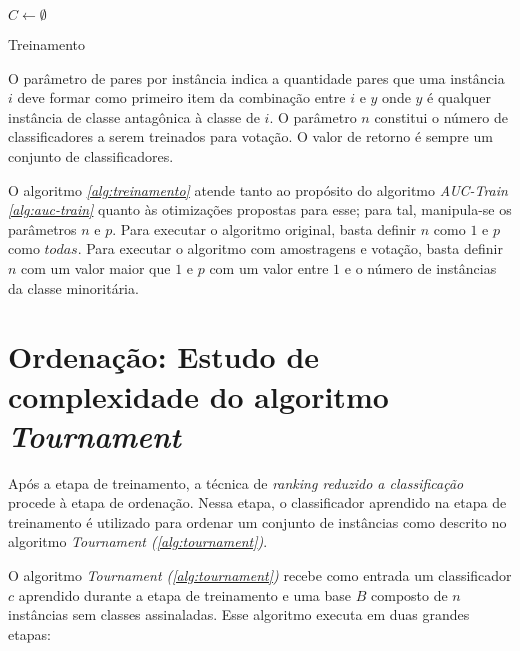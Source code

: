 \begin{algorithm}[h]

    $C \gets \emptyset$



    \caption{Treinamento}
    \label{alg:treinamento}
\end{algorithm}

O parâmetro de pares por instância indica a quantidade pares que uma instância $i$ deve formar como primeiro item da combinação entre $i$ e $y$ onde $y$ é qualquer instância de classe antagônica à classe de $i$. O parâmetro $n$ constitui o número de classificadores a serem treinados para votação. O valor de retorno é sempre um conjunto de classificadores.

O algoritmo \emph{\ref{alg:treinamento}} atende tanto ao propósito do algoritmo \emph{AUC-Train \ref{alg:auc-train}} quanto às otimizações propostas para esse; para tal, manipula-se os parâmetros $n$ e $p$. Para executar o algoritmo original, basta definir $n$ como $1$ e $p$ como $todas$. Para executar o algoritmo com amostragens e votação, basta definir $n$ com um valor maior que $1$ e $p$ com um valor entre $1$ e o número de instâncias da classe minoritária.


\section{Ordenação: Estudo de complexidade do algoritmo \emph{Tournament}}

Após a etapa de treinamento, a técnica de \emph{ranking reduzido a classificação} procede à etapa de ordenação. Nessa etapa, o classificador aprendido na etapa de treinamento é utilizado para ordenar um conjunto de instâncias como descrito no algoritmo \emph{Tournament (\ref{alg:tournament})}.

O algoritmo \emph{Tournament (\ref{alg:tournament})} recebe como entrada um classificador $c$ aprendido durante a etapa de treinamento e uma base $B$ composto de $n$ instâncias sem classes assinaladas. Esse algoritmo executa em duas grandes etapas:

